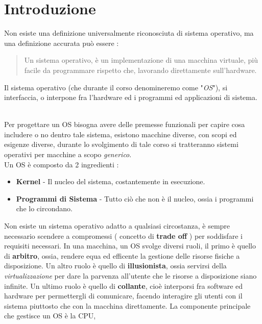 \documentclass[12pt, letterpaper]{article}
\begin{document}
\section{Introduzione}
Non esiste una definizione universalmente riconosciuta di sistema operativo, ma una definizione accurata
può essere :
\begin{quote}
    Un sistema operativo, è un implementazione di una macchina virtuale, più facile da programmare rispetto che,
    lavorando direttamente sull'hardware.
\end{quote}
Il sistema operativo (che durante il corso denomineremo come "\textit{OS}"), si interfaccia, o interpone fra
l'hardware ed i programmi ed applicazioni di sistema.
\begin{figure}[h]
\end{figure}\\
Per progettare un OS bisogna avere delle premesse funzionali per capire cosa includere o no dentro tale
sistema, esistono macchine diverse, con scopi ed esigenze diverse, durante lo svolgimento di tale corso
si tratteranno sistemi operativi per macchine a scopo \textit{generico}. \\Un OS è composto da 2 ingredienti :
\begin{itemize}
    \item \textbf{Kernel} - Il nucleo del sistema, costantemente in esecuzione.
    \item \textbf{Programmi di Sistema} - Tutto ciò che non è il nucleo, ossia i programmi che lo circondano.
\end{itemize}  
Non esiste un sistema operativo adatto a qualsiasi circostanza, è sempre necessario scendere a compromessi (
   concetto di \textbf{trade off}
) per soddisfare i requisiti necessari. In una macchina, un OS svolge diversi ruoli, il primo è quello di
\textbf{arbitro}, ossia, rendere equa ed efficente la gestione delle risorse fisiche a disposizione. Un altro 
ruolo è quello di \textbf{illusionista}, ossia servirsi della \textit{virtualizzazione} per dare la parvenza
all'utente che le risorse a disposizione siano infinite. Un ultimo ruolo è quello di \textbf{collante}, cioè 
interporsi fra software ed hardware per permettergli di comunicare, facendo interagire gli utenti con il
sistema piuttosto che con la macchina direttamente. La componente principale che gestisce un OS è la CPU, 
\end{document}
